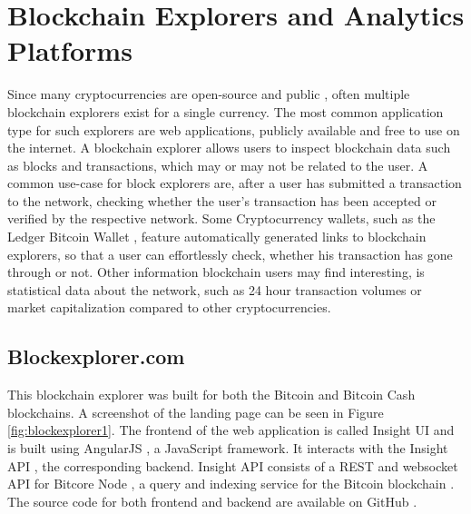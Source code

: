 \section{Blockchain Explorers and Analytics Platforms}
Since many cryptocurrencies are open-source and public \cite{ethereum} \cite{bitcoin}, often multiple blockchain explorers exist for a single currency. The most common application type for such explorers are web applications, publicly available and free to use on the internet. A blockchain explorer allows users to inspect blockchain data such as blocks and transactions, which may or may not be related to the user. A common use-case for block explorers are, after a user has submitted a transaction to the network, checking whether the user's transaction has been accepted or verified by the respective network. Some Cryptocurrency wallets, such as the Ledger Bitcoin Wallet \cite{btcwallet}, feature automatically generated links to blockchain explorers, so that a user can effortlessly check, whether his transaction has gone through or not. Other information blockchain users may find interesting, is statistical data about the network, such as 24 hour transaction volumes or market capitalization compared to other cryptocurrencies. 

\subsection{Blockexplorer.com \cite{blockexplorer}}
This blockchain explorer was built for both the Bitcoin \cite{bitcoin} and Bitcoin Cash \cite{bitcoincash} blockchains. A screenshot of the landing page can be seen in Figure \ref{fig:blockexplorer1}. The frontend of the web application is called Insight UI \cite{insightui} and is built using AngularJS \cite{angular}, a JavaScript \cite{javascript} framework. It interacts with the Insight API \cite{insightapi}, the corresponding backend. Insight API consists of a REST and websocket API for Bitcore Node \cite{bitcorenode}, a query and indexing service for the Bitcoin blockchain \cite{bitcoin}. The source code for both frontend and backend are available on GitHub \cite{insightui} \cite{insightapi}.

